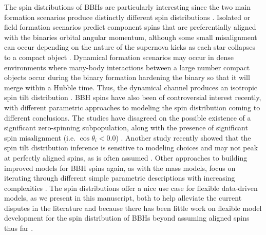 The spin distributions of BBHs are particularly interesting since the two main formation scenarios produce distinctly different spin distributions . 
Isolated or field formation scenarios predict component spins that are preferentially aligned with the binaries orbital angular momentum, although some small 
misalignment can occur depending on the nature of the supernova kicks as each star collapses to a compact object . Dynamical formation scenarios may 
occur in dense environments where many-body interactions between a large number compact objects occur during the binary formation hardening the binary so that it 
will merge within a Hubble time. Thus, the dynamical channel produces an isotropic spin tilt distribution . BBH spins have also been of controversial 
interest recently, with different parametric approaches to modeling the spin distribution coming to different conclusions. The studies have disagreed on the possible existence 
of a significant zero-spinning subpopulation, along with the presence of significant spin misalignment (i.e. $\cos{\theta_i} < 0.0$) \citep{o3b_astro_dist,RouletGWTC2Pop,BuildBetterSpinModels,GWTC3MonashSpin,Callister_NoEvidence}. 
Another study recently showed that the spin tilt distribution inference is sensitive to modeling choices and may not peak at perfectly aligned spins, as is often assumed \citep{spinitasyoulike}. 
Other approaches to building improved models for BBH spins again, as with the mass models, focus on iterating through different simple parametric descriptions with 
increasing complexities \citep{BuildBetterSpinModels,Callister_NoEvidence,spinitasyoulike}. The spin distributions offer a nice use case for flexible data-driven models, as 
we present in this manuscript, both to help alleviate the current disputes in the literature and because there has been little work on flexible model development for the 
spin distribution of BBHs beyond assuming aligned spins thus far \citep{Tiwari_2021_a,Tiwari_2021_b}.

